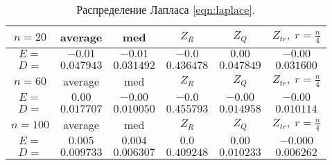 \documentclass[a4]{article}
\begin{document}
\begin{table}[H]
\caption{\label{tab:laplace} Распределение Лапласа \eqref{eqn:laplace}.}
\begin{center}
\begin{tabular}{|c|c|c|c|c|c|}
\hline
$n = 20$    & average & med & $Z_R$ & $Z_Q$ & $Z_{tr},\;r=\frac{n}{4}$\\ \hline 
$E = $    &  	$-0.01$  & 	$-0.01$   &	$-0.0$   &	$0.00$    &	$-0.00$   \\ \hline
$D = $     & 	$0.047943$  &  	$0.031492$    &	$0.436478$    &	$0.047849$    &	$0.031600$    \\ \hline
					
$n = 60$  & average & med & $Z_R$ & $Z_Q$ & $Z_{tr},\;r=\frac{n}{4}$\\ \hline
$E = $     & 	$0.00$    &	$-0.00$   &	$-0.0$   &	$-0.00$   &	$-0.00$   \\ \hline
$D =$      & 	$0.017707$   & 	$0.010050$   & 	$0.455793$    &	$0.014958$    &	$0.010114$    \\ \hline
					
$n = 100$   & average & med & $Z_R$ & $Z_Q$ & $Z_{tr},\;r=\frac{n}{4}$\\ \hline
$E =$      & 	$0.005$    &	$0.004$    &	$0.0$    &	$0.00$    &	$-0.000$   \\ \hline
$D = $     & 	$0.009733$    &	$0.006307$   & 	$0.409248$  &  	$0.010233$    &	$0.006262$    \\ 
\hline
\end{tabular}
\end{center}
\end{table}
\end{document}
